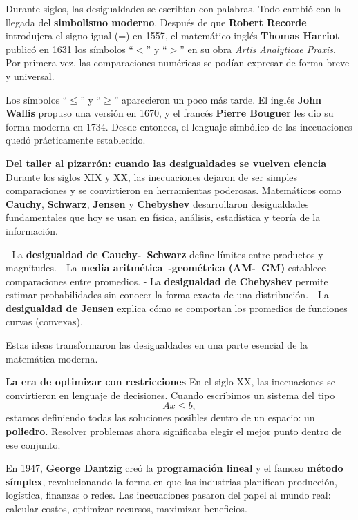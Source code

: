 \begin{reseñaplana}
Durante siglos, las desigualdades se escribían con palabras.  
Todo cambió con la llegada del \textbf{simbolismo moderno}.  
Después de que \textbf{Robert Recorde} introdujera el signo igual (=) en 1557, el matemático inglés \textbf{Thomas Harriot} 
publicó en 1631 los símbolos ``$<$'' y ``$>$'' en su obra \textit{Artis Analyticae Praxis}.  
Por primera vez, las comparaciones numéricas se podían expresar de forma breve y universal.  

Los símbolos ``$\leq$'' y ``$\geq$'' aparecieron un poco más tarde.  
El inglés \textbf{John Wallis} propuso una versión en 1670, y el francés \textbf{Pierre Bouguer} les dio su forma moderna en 1734.  
Desde entonces, el lenguaje simbólico de las inecuaciones quedó prácticamente establecido.  

\textbf{Del taller al pizarrón: cuando las desigualdades se vuelven ciencia}  
Durante los siglos XIX y XX, las inecuaciones dejaron de ser simples comparaciones y se convirtieron en herramientas poderosas.  
Matemáticos como \textbf{Cauchy}, \textbf{Schwarz}, \textbf{Jensen} y \textbf{Chebyshev} desarrollaron desigualdades fundamentales 
que hoy se usan en física, análisis, estadística y teoría de la información.  

- La \textbf{desigualdad de Cauchy-–Schwarz} define límites entre productos y magnitudes.  
- La \textbf{media aritmética–-geométrica (AM-–GM)} establece comparaciones entre promedios.  
- La \textbf{desigualdad de Chebyshev} permite estimar probabilidades sin conocer la forma exacta de una distribución.  
- La \textbf{desigualdad de Jensen} explica cómo se comportan los promedios de funciones curvas (convexas).  

Estas ideas transformaron las desigualdades en una parte esencial de la matemática moderna.  

\textbf{La era de optimizar con restricciones}  
En el siglo XX, las inecuaciones se convirtieron en lenguaje de decisiones.  
Cuando escribimos un sistema del tipo
\[
Ax \leq b,
\]
estamos definiendo todas las soluciones posibles dentro de un espacio: un \textbf{poliedro}.  
Resolver problemas ahora significaba elegir el mejor punto dentro de ese conjunto.

En 1947, \textbf{George Dantzig} creó la \textbf{programación lineal} y el famoso \textbf{método símplex}, revolucionando la forma 
en que las industrias planifican producción, logística, finanzas o redes.  
Las inecuaciones pasaron del papel al mundo real: calcular costos, optimizar recursos, maximizar beneficios.  
\end{reseñaplana}

